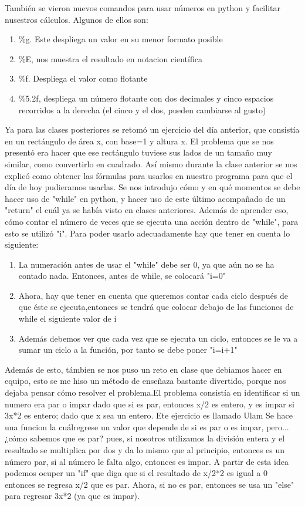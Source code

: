 \documentclass{book}
\begin{document}
	También se vieron nuevos comandos para usar números en python y facilitar nusestros cálculos. Algunos de ellos son:
	\begin{enumerate}
		\item 
		\%g. Este despliega un valor en su menor formato posible
		\item 
		\%E, nos muestra el resultado en notacion científica
		\item 
		\%f. Despliega el valor como flotante
		\item 
		\%5.2f, despliega un número flotante con dos decimales y cinco espacios recorridos a la derecha (el cinco y el dos, pueden cambiarse al gusto)
	\end{enumerate}
	Ya para las clases posteriores se retomó un ejercicio del día anterior, que consistía en un rectángulo de área x, con base=1 y altura x. El problema que se nos presentó era hacer que ese rectángulo tuviese sus lados de un tamaño muy similar, como convertirlo en cuadrado.
		Así mismo durante la clase anterior se nos explicó como obtener las fórmulas para usarlos en nuestro programa para que el día de hoy pudieramos usarlas. Se nos introdujo cómo y en qué momentos se debe hacer uso de "while" en python, y hacer uso de este último acompañado de un "return" el cuál ya se había visto en clases anteriores.
		Además de aprender eso, cómo contar el número de veces que se ejecuta una acción dentro de "while", para esto se utilizó "i". Para poder usarlo adecuadamente hay que tener en cuenta lo siguiente:
		\begin{enumerate}
			\item 
			La numeración antes de usar el "while" debe ser 0, ya que aún no se ha contado nada. Entonces, antes de while, se colocará "i=0"
			\item 
			Ahora, hay que tener en cuenta que queremos contar cada ciclo después de que éste se ejecuta,entonces se tendrá que colocar debajo de las funciones de while el siguiente valor de i
			\item 
			Además debemos ver que cada vez que se ejecuta un ciclo, entonces se le va a sumar un ciclo a la función, por tanto se debe poner "i=i+1"
		\end{enumerate}
		Además de esto, támbien se nos puso un reto en clase que debiamos hacer en equipo, esto se me hiso un método de enseñaza bastante divertido, porque nos dejaba pensar cómo resolver el problema.El problema consistía en identificar si un numero era par o impar dado que si es par, entonces x/2 es entero, y es impar si 3x*2 es entero; dado que x sea un entero. Ete ejercicio es llamado Ulam
		Se hace una funcion la cuálregrese un valor que depende de si es par o es impar, pero...¿cómo sabemos que es par? pues, si nosotros utilizamos la división entera y el resultado se multiplica por dos y da lo mismo que al principio, entonces es un número par, si al número le falta algo, entonces es impar.
		A partir de esta idea podemos ocuper un "if" que diga que si el resultado de x/2*2 es igual a 0 entonces se regresa x/2 que es par.
		Ahora, si no es par, entonces se usa un "else" para regresar 3x*2 (ya que es impar).
		
\end{document}
